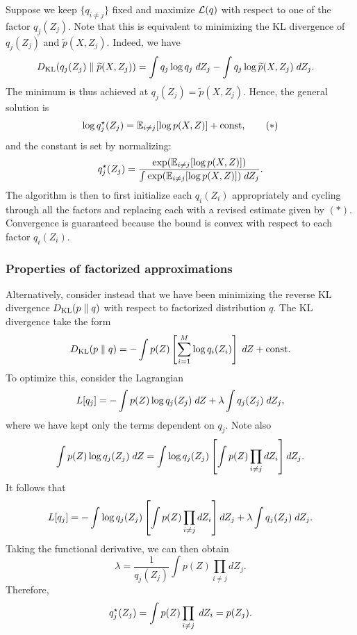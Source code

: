 \documentclass[a4paper]{article}
\begin{document}
Suppose we keep $\{q_{i \neq j}\}$ fixed and maximize
$\mathcal{L}(q)$ with respect to one of the factor
$q_j(Z_j)$. Note that this is equivalent
to minimizing the KL divergence of $q_j(Z_j)$ and $\tilde{p}
(X, Z_j)$. Indeed, we have 
\[
\begin{aligned}
D_{\text{KL}}(q_j (Z_j) \; \Vert \; \widetilde{p}(X, Z_j)) 
&= \int q_j \log q_j \; d Z_j 
- \int q_j \log \widetilde{p} (X, Z_j) \; d Z_j. 
\end{aligned}
\]
The minimum is thus achieved at $q_j(Z_j)
= \tilde{p} (X, Z_j)$. Hence, the general solution is
\begin{equation*}
  \log q_j^\star (Z_j) = \mathbb{E}_{i \neq j} [\log p(X, Z)] +
  \mathrm{const},
  \tag{$*$}
\end{equation*}
and the constant is set by normalizing:
\[
q^\star_j(Z_j)
= \frac{\exp (\mathbb{E}_{i \neq j} [\log p(X, Z)])}
{\int \exp (\mathbb{E}_{i \neq j} [\log p(X, Z)]) \; d Z_j}.
\]
The algorithm is then to first initialize each $q_i (Z_i)$
appropriately and cycling through all the factors and
replacing each with a revised estimate given by $(*)$.
Convergence is guaranteed because the bound is convex
with respect to each factor $q_i(Z_i)$.

\subsubsection{Properties of factorized approximations}

Alternatively, consider instead that we have been minimizing 
the reverse KL divergence $D_{\text{KL}}(p \; \Vert \; q)$ with respect to 
factorized distribution $q$. The KL divergence
take the form 
\[
D_{\text{KL}}(p \; \Vert \; q) = - \int p(Z) \left[ \sum_{i=1}^M \log q_i 
(Z_i) \right] \; d Z + \mathrm{const}.
\]
To optimize this, consider the Lagrangian 
\[
\begin{aligned}
L[q_j] = - \int p(Z) \log q_j(Z_j) \; d Z + 
\lambda \int q_j (Z_j) \; d Z_j,
\end{aligned}
\]
where we have kept only the terms dependent on $q_j$. 
Note also
\[
\begin{aligned}
\int p(Z) \log q_j (Z_j) \; d Z 
= \int \log q_j(Z_j) \left[ \int p(Z) \prod_{i \neq j} 
d Z_i \right] d Z_j.
\end{aligned}
\]
It follows that
\[
L[q_j] = -\int \log q_j(Z_j) \left[ \int p(Z) \prod_{i \neq j} 
d Z_i \right] d Z_j + \lambda \int q_j(Z_j) \; d Z_j.
\]
Taking the functional derivative, we can then obtain
\[
\lambda = 
\frac{1}{q_j(Z_j)} \int p(Z) \prod_{i \neq j} d Z_j.
\]
Therefore, 
\[
q_j^\star (Z_j) = \int p(Z) \prod_{i \neq j} \; d Z_i = p(Z_j).
\]
\end{document}
